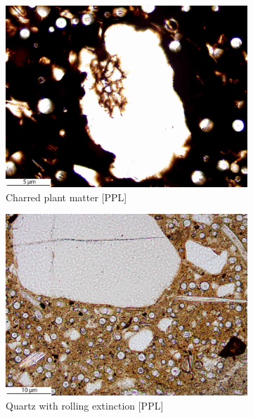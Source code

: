 \documentclass[a4paper]{article}
\begin{document}
\begin{figure}[H]
\begin{subfigure}[t]{.32\textwidth}
		\includegraphics[width=\textwidth]{ThinSections/98-3_40x_PPL.jpg}
		\caption{Charred plant matter [PPL]}
	\end{subfigure}\hspace{.1em}\hfill
	\begin{subfigure}[t]{.32\textwidth}
		\includegraphics[width=\textwidth]{ThinSections/98-5_20x_PPL.jpg}
		\caption{Quartz with rolling extinction [PPL]}
	\end{subfigure}\hspace{.1em}\hfill
	\begin{subfigure}[t]{.32\textwidth}

\end{subfigure}
\end{figure}
\end{document}
